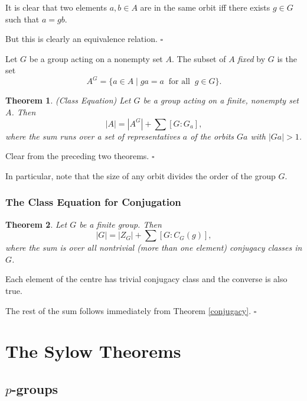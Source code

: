 \documentclass[10pt]{article}
\newtheorem{theorem}{Theorem}[section]
\newenvironment{proof}[1][Proof]{\begin{trivlist}
\item[\hskip \labelsep {\itshape #1}]}{\end{trivlist}}
\newenvironment{definition}[1][Definition]{\begin{trivlist}
\item[\hskip \labelsep {\bfseries #1}]}{\end{trivlist}}
\begin{document}
\begin{proof}
It is clear that two elements $a, b \in A$ are in the same orbit iff there exists $g \in G$ such that $a = gb$.

But this is clearly an equivalence relation. $\square$
\end{proof}

\begin{definition}
Let $G$ be a group acting on a nonempty set $A$. The subset of $A$ \emph{fixed} by $G$ is the set
$$A^G = \{a \in A \;|\; ga = a \;\;\mbox{for all}\;\; g \in G\}.$$
\end{definition}

\begin{theorem} (Class Equation)
Let $G$ be a group acting on a finite, nonempty set $A$. Then
$$|A| = |A^G| + \sum [G:G_a],$$
where the sum runs over a set of representatives $a$ of the orbits $Ga$ with $|Ga| > 1$.
\end{theorem}

\begin{proof}
Clear from the preceding two theorems. $\square$
\end{proof}

In particular, note that the size of any orbit divides the order of the group $G$.

\subsubsection{The Class Equation for Conjugation}

\begin{theorem}
Let $G$ be a finite group. Then
$$|G| = |Z_G| + \sum [G:C_G(g)],$$
where the sum is over all nontrivial (more than one element) conjugacy classes in $G$.
\end{theorem}

\begin{proof}
Each element of the centre has trivial conjugacy class and the converse is also true.

The rest of the sum follows immediately from Theorem \ref{conjugacy}. $\square$
\end{proof}

\section{The Sylow Theorems}

\subsection{$p$-groups}
\end{document}
